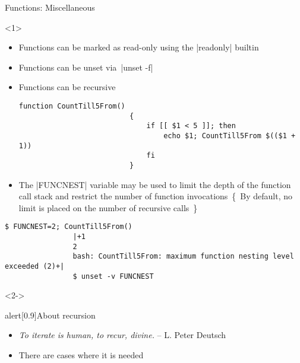 \begin{frame}[fragile]{Functions: Miscellaneous}
    \begin{overlayarea}{\textwidth}{0.7\textheight}
        \begin{onlyenv}<1>
            \vspace{-3mm}
            \begin{itemize}
                \item Functions can be marked as read-only using the \bash|readonly| builtin
                \item Functions can be unset via \,\bash|unset -f|
                \item Functions can be recursive
                      \begin{lstlisting}[style=MyBash, xrightmargin=12mm, aboveskip=2mm, belowskip=-6mm]
                          function CountTill5From()
                          {
                              if [[ $1 < 5 ]]; then
                                  echo $1; CountTill5From $(($1 + 1))
                              fi
                          }
                      \end{lstlisting}
                \item The \bash|FUNCNEST| variable may be used to limit the depth of the function call stack and restrict the number of function invocations
                      \,{\tiny\{~By default, no limit is placed on the number of recursive calls~\}}
            \end{itemize}
            \begin{lstlisting}[style=MyBash, xrightmargin=-2mm, xleftmargin=2mm, aboveskip=0mm]
                $ FUNCNEST=2; CountTill5From()
                |+1
                2
                bash: CountTill5From: maximum function nesting level exceeded (2)+|
                $ unset -v FUNCNEST
            \end{lstlisting}
        \end{onlyenv}
        \begin{onlyenv}<2->
            \vspace{-9mm}
            \begin{varblock}{alert}[0.9\textwidth]{About recursion}
                \begin{itemize}
                    \item \emph{\guillemotleft To iterate is human, to recur, divine.\guillemotright} -- L. Peter Deutsch
                    \item There are cases where it is needed

\end{itemize}
\end{varblock}
\end{onlyenv}
\end{overlayarea}
\end{frame}
